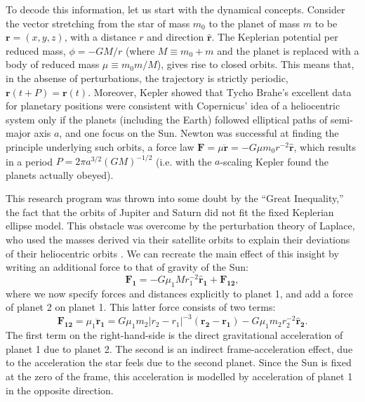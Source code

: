 \documentclass[graybox,natbib,nosecnum]{svmult}
\begin{document}
To decode this information, let us start with the dynamical concepts.  Consider the vector stretching from the star of mass $m_0$ to the planet of mass $m$ to be $\mathbf{r}=(x,y,z)$, with a distance $r$ and direction $\mathbf{\hat r}$.  The Keplerian potential per reduced mass, $\phi=-GM/r$ (where $M \equiv m_0 + m$ and the planet is replaced with a body of reduced mass $\mu \equiv m_0 m /M$), gives rise to closed orbits.  This means that, in the absense of perturbations, the trajectory is strictly periodic, $\mathbf{r}(t+P) = \mathbf{r}(t)$.  Moreover, Kepler showed that Tycho Brahe's excellent data for planetary positions were consistent with Copernicus' idea of a heliocentric system only if the planets (including the Earth) followed elliptical paths of semi-major axis $a$, and one focus on the Sun. Newton was successful at finding the principle underlying such orbits, a force law $\mathbf{F} = \mu \mathbf{\ddot r} =-G \mu m_0 r^{-2} \mathbf{\hat r}$, which results in a period $P = 2 \pi a^{3/2} (GM)^{-1/2}$ (i.e. with the $a$-scaling Kepler found the planets actually obeyed).

This research program was thrown into some doubt by the ``Great Inequality,'' the fact that the orbits of Jupiter and Saturn did not fit the fixed Keplerian ellipse model.  This obstacle was overcome by the perturbation theory of Laplace, who used the masses derived via their satellite orbits to explain their deviations of their heliocentric orbits \citep{1985Wilson}.  We can recreate the main effect of this insight by writing an additional force to that of gravity of the Sun: 
\begin{equation}
\mathbf{F_{1}} = -G \mu_1 M r_{1}^{-2} \mathbf{\hat r_{1}} + \mathbf{F_{12}},
\end{equation}
where we now specify forces and distances explicitly to planet 1, and add a force of planet 2 on planet 1.  This latter force consists of two terms: 
\begin{equation}
\mathbf{F_{12}} = \mu_1 \mathbf{\ddot r_1} = G \mu_1 m_2 \vert r_{2}-r_{1}\vert^{-3} (\mathbf{r_{2}} - \mathbf{r_{1}}) - G \mu_1 m_2 r_{2}^{-2} \mathbf{\hat r_{2}}.
\end{equation}
The first term on the right-hand-side is the direct gravitational acceleration of planet 1 due to planet 2.  The second is an indirect frame-acceleration effect, due to the acceleration the star feels due to the second planet.  Since the Sun is fixed at the zero of the frame, this acceleration is modelled by acceleration of planet 1 in the opposite direction.
\end{document}
